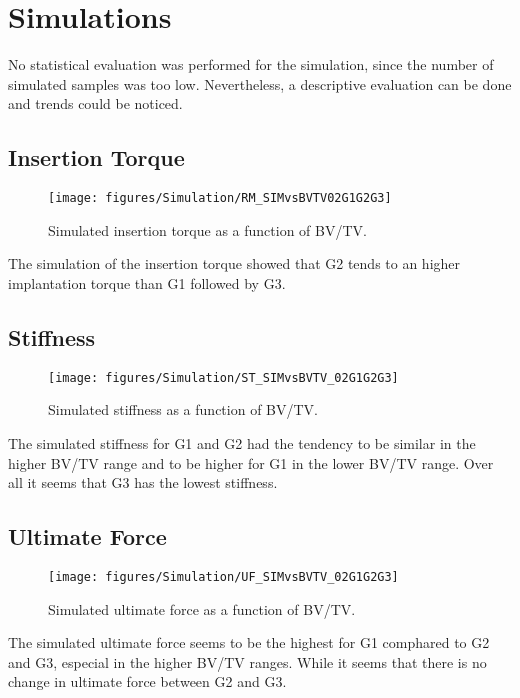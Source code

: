 \documentclass[12pt, a4paper, twoside]{report}
\begin{document}
\section{Simulations}
%
No statistical evaluation was performed for the simulation, since the number of simulated samples was too low. Nevertheless, a descriptive evaluation can be done and trends could be noticed. \\
%
\begin{figure}[H]
\centering 
{}
\label{fig:UF_simvsexp}
\end{figure}
%
\subsection{Insertion Torque}
%
\begin{figure}[H]
  \centering
      \texttt{[image: figures/Simulation/RM\_SIMvsBVTV02G1G2G3]}
  \caption{Simulated insertion torque as a function of BV/TV.}
  \label{fig:RM_sim}
\end{figure}
%
The simulation of the insertion torque showed that G2 tends to an higher implantation torque than G1 followed by G3. 
%
\subsection{Stiffness}
%
\begin{figure}[H]
  \centering
      \texttt{[image: figures/Simulation/ST\_SIMvsBVTV\_02G1G2G3]}
  \caption{Simulated stiffness as a function of BV/TV.}
  \label{fig:sigma_sim}
\end{figure}
%
The simulated stiffness for G1 and G2 had the tendency to be similar in the higher BV/TV range and to be higher for G1 in the lower BV/TV range. Over all it seems that G3 has the lowest stiffness.
%
\subsection{Ultimate Force}
%
\begin{figure}[H]
  \centering
      \texttt{[image: figures/Simulation/UF\_SIMvsBVTV\_02G1G2G3]}
  \caption{Simulated ultimate force as a function of BV/TV.}
  \label{fig:UF_sim}
\end{figure}
%
The simulated ultimate force seems to be the highest for G1 comphared to G2 and G3, especial in the higher BV/TV ranges. While it seems that there is no change in ultimate force between G2 and G3.
%
%
%
\end{document}
